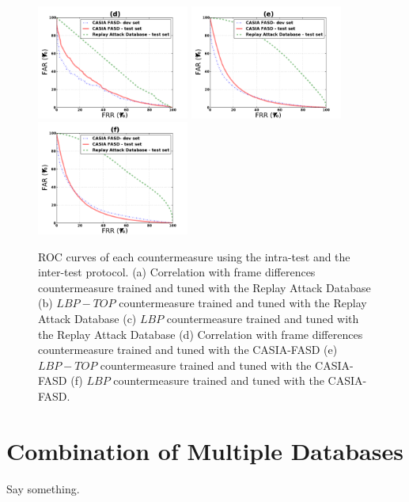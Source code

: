\begin{figure}[ht]
\begin{center}
\includegraphics [width=5cm] {plots/CROSS-DATABASE/MOTION/roc_casia_fasd-machine.pdf} 
\includegraphics [width=5cm] {plots/CROSS-DATABASE/LBPTOP/roc_casia_fasd-machine.pdf}
\includegraphics [width=5cm] {plots/CROSS-DATABASE/LBP/roc_casia_fasd-machine.pdf}

\caption{ROC curves of each countermeasure using the intra-test and the inter-test protocol. (a) Correlation with frame differences countermeasure trained and tuned with the Replay Attack Database (b) $LBP-TOP$ countermeasure trained and tuned with the Replay Attack Database (c) $LBP$ countermeasure trained and tuned with the Replay Attack Database (d) Correlation with frame differences countermeasure trained and tuned with the CASIA-FASD (e) $LBP-TOP$ countermeasure trained and tuned with the CASIA-FASD (f) $LBP$ countermeasure trained and tuned with the CASIA-FASD.} 
\label{fig:ROC_cross}
\end{center}
\end{figure}


\section{Combination of Multiple Databases}
\label{sec:combination}

Say something.


